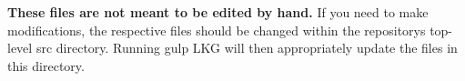 {\bfseries{These files are not meant to be edited by hand.}} If you need to make modifications, the respective files should be changed within the repository\textquotesingle{}s top-\/level {\ttfamily src} directory. Running {\ttfamily gulp L\+KG} will then appropriately update the files in this directory. 